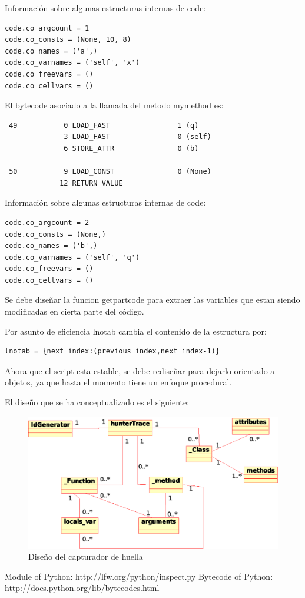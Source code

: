 \documentclass[10pt,a4paper]{article}
\begin{document}
Información sobre algunas estructuras internas de code:

\begin{verbatim}
code.co_argcount = 1
code.co_consts = (None, 10, 8)
code.co_names = ('a',)
code.co_varnames = ('self', 'x')
code.co_freevars = ()
code.co_cellvars = ()
\end{verbatim}

El bytecode asociado a la llamada del metodo mymethod es:

\begin{verbatim}
 49           0 LOAD_FAST                1 (q)
              3 LOAD_FAST                0 (self)
              6 STORE_ATTR               0 (b)

 50           9 LOAD_CONST               0 (None)
             12 RETURN_VALUE 
\end{verbatim}

Información sobre algunas estructuras internas de code:

\begin{verbatim}
code.co_argcount = 2
code.co_consts = (None,)
code.co_names = ('b',)
code.co_varnames = ('self', 'q')
code.co_freevars = ()
code.co_cellvars = ()
\end{verbatim}


Se debe diseñar la funcion getpartcode para extraer las variables que estan siendo modificadas en cierta parte del código.

Por asunto de eficiencia lnotab cambia el contenido de la estructura por:

\begin{verbatim}
lnotab = {next_index:(previous_index,next_index-1)}
\end{verbatim}

Ahora que el script esta estable, se debe rediseñar para dejarlo orientado a objetos, ya que hasta el momento tiene un enfoque procedural.

\pagebreak

El diseño que se ha conceptualizado es el siguiente:

\begin{figure}[hpb]
	\centering
	\includegraphics[scale=1]{images/class_diagram.eps}
	\caption{Diseño del capturador de huella}
\end{figure}

\pagebreak

\begin{thebibliography}{2}
 Module of Python: http://lfw.org/python/inspect.py
 Bytecode of Python: http://docs.python.org/lib/bytecodes.html
\end{thebibliography}
\end{document}
